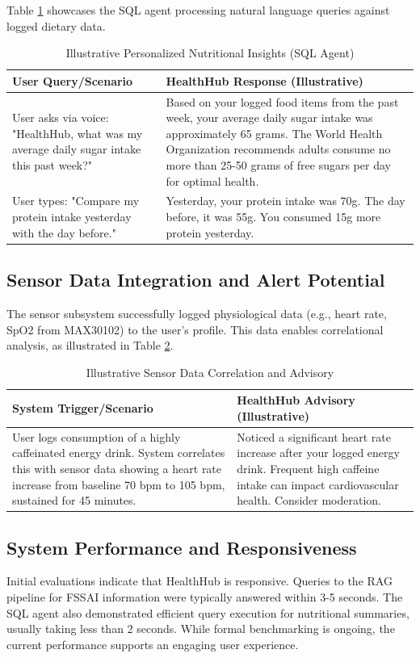Table \ref{tab:sql-agent-examples} showcases the SQL agent processing natural language queries against logged dietary data.

\begin{table}[!ht]
\centering
\caption{Illustrative Personalized Nutritional Insights (SQL Agent)}
\label{tab:sql-agent-examples}
\begin{tabular}{|p{}|p{}|}
\hline
\textbf{User Query/Scenario} & \textbf{HealthHub Response (Illustrative)} \\
\hline
User asks via voice: "HealthHub, what was my average daily sugar intake this past week?" & Based on your logged food items from the past week, your average daily sugar intake was approximately 65 grams. The World Health Organization recommends adults consume no more than 25-50 grams of free sugars per day for optimal health. \\
\hline
User types: "Compare my protein intake yesterday with the day before." & Yesterday, your protein intake was 70g. The day before, it was 55g. You consumed 15g more protein yesterday. \\
\hline
\end{tabular}
\end{table}

\subsection{Sensor Data Integration and Alert Potential}
The sensor subsystem successfully logged physiological data (e.g., heart rate, SpO2 from MAX30102) to the user's profile. This data enables correlational analysis, as illustrated in Table \ref{tab:sensor-alert-example}.

\begin{table}[!ht]
\centering
\caption{Illustrative Sensor Data Correlation and Advisory}
\label{tab:sensor-alert-example}
\begin{tabular}{|p{}|p{}|}
\hline
\textbf{System Trigger/Scenario} & \textbf{HealthHub Advisory (Illustrative)} \\
\hline
User logs consumption of a highly caffeinated energy drink. System correlates this with sensor data showing a heart rate increase from baseline 70 bpm to 105 bpm, sustained for 45 minutes. & Noticed a significant heart rate increase after your logged energy drink. Frequent high caffeine intake can impact cardiovascular health. Consider moderation. \\
\hline
\end{tabular}
\end{table}

\subsection{System Performance and Responsiveness}
Initial evaluations indicate that HealthHub is responsive. Queries to the RAG pipeline for FSSAI information were typically answered within 3-5 seconds. The SQL agent also demonstrated efficient query execution for nutritional summaries, usually taking less than 2 seconds. While formal benchmarking is ongoing, the current performance supports an engaging user experience. 